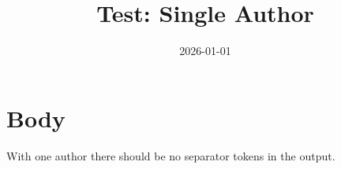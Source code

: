 \documentclass{article}
\title{Test: Single Author}
\date{2026-01-01}
\begin{document}
\maketitle
\section{Body}
With one author there should be no separator tokens in the output.
\end{document}
